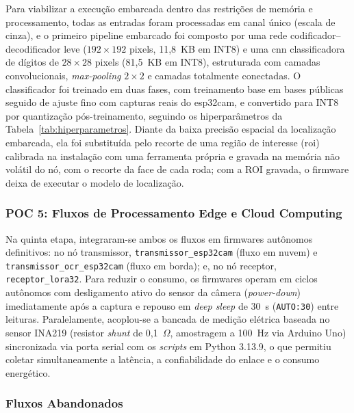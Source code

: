 Para viabilizar a execução embarcada dentro das restrições de memória e processamento,
todas as entradas foram processadas em canal único (escala de cinza), e o primeiro
pipeline embarcado foi composto por uma rede codificador--decodificador leve
($192 \times 192$ pixels, 11,8~KB em INT8) e uma \gls{cnn} classificadora de dígitos de
$28 \times 28$ pixels (81,5~KB em INT8), estruturada com camadas convolucionais,
\textit{max-pooling} $2 \times 2$ e camadas totalmente conectadas. O classificador foi
treinado em duas fases, com treinamento base em bases públicas
\cite{kucev2020, zhao2026wordwheel} seguido de ajuste fino com capturas reais do
\gls{esp32cam}, e convertido para INT8 por quantização pós-treinamento, seguindo os
hiperparâmetros da Tabela~\ref{tab:hiperparametros}. Diante da baixa precisão espacial da
localização embarcada, ela foi substituída pelo recorte de uma região de interesse
(\gls{roi}) calibrada na instalação com uma ferramenta própria e gravada na memória não
volátil do nó, com o recorte da face de cada roda; com a ROI gravada, o firmware deixa de
executar o modelo de localização.

\subsubsection{POC 5: Fluxos de Processamento Edge e Cloud Computing}
\label{metodologia_pesquisa:poc5}

Na quinta etapa, integraram-se ambos os fluxos em firmwares autônomos
definitivos: no nó transmissor, \texttt{transmissor\_\allowbreak esp32cam}
(fluxo em nuvem) e \texttt{transmissor\_\allowbreak ocr\_\allowbreak esp32cam}
(fluxo em borda); e, no nó receptor, \texttt{receptor\_\allowbreak lora32}.
Para reduzir o consumo, os firmwares operam em ciclos autônomos com
desligamento ativo do sensor da câmera (\textit{power-down}) imediatamente após
a captura e repouso em \textit{deep sleep} de 30~s (\texttt{AUTO:30}) entre
leituras. Paralelamente, acoplou-se a bancada de medição elétrica baseada no
sensor INA219 (resistor \textit{shunt} de 0,1~$\Omega$, amostragem a 100~Hz via
Arduino Uno) sincronizada via porta serial com os \textit{scripts} em Python
3.13.9, o que permitiu coletar simultaneamente a latência, a confiabilidade do
enlace e o consumo energético.

\subsubsection{Fluxos Abandonados}
\label{subsubsec:fluxos_abandonados}

